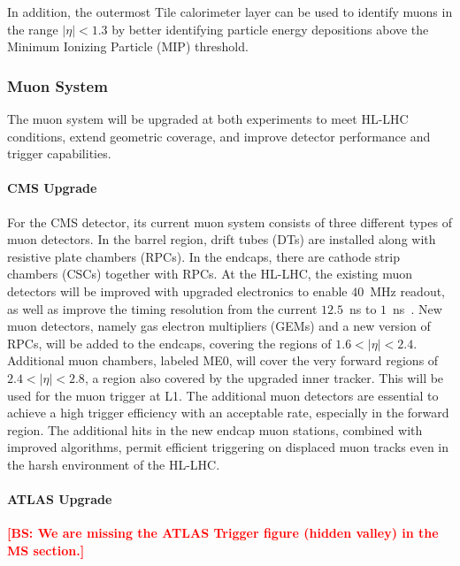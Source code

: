 In addition, the outermost Tile calorimeter layer can be used to identify muons in the range $|\eta| < 1.3$ by better identifying particle energy depositions above the Minimum Ionizing Particle (MIP) threshold.

\subsubsection{Muon System} \label{sec:upgrademuon}

The muon system will be upgraded at both experiments to meet HL-LHC conditions, extend geometric coverage, and improve detector performance and trigger capabilities. 

\paragraph{CMS Upgrade} 

For the CMS detector, its current muon system consists of three different types of muon detectors. In the barrel region, drift tubes (DTs) are installed along with resistive plate chambers (RPCs). In the endcaps, there are cathode strip chambers (CSCs) together with RPCs. At the HL-LHC, the existing muon detectors will be improved with upgraded electronics to enable $40$~MHz readout, as well as improve the timing resolution from the current $12.5$~ns to $1$~ns~\cite{Lourenco:2283189}. New muon detectors, namely gas electron multipliers (GEMs) and a new version of RPCs, will be added to the endcaps, covering the regions of $1.6<|\eta|<2.4$. Additional muon chambers, labeled ME0, will cover the very forward regions of $2.4<|\eta|<2.8$, a region also covered by the upgraded inner tracker. This will be used for the muon trigger at L1. The additional muon detectors are essential to achieve a high trigger efficiency with an acceptable rate, especially in the forward region. The additional hits in the new endcap muon stations, combined with improved algorithms, permit efficient triggering on displaced muon tracks even in the harsh environment of the HL-LHC. 

\paragraph{ATLAS Upgrade}

{\bf \textcolor{red}{[BS: We are missing the ATLAS Trigger figure (hidden valley) in the MS section.]}}

